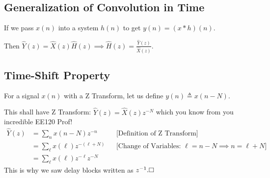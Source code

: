 \subsection{ Generalization of Convolution in Time}
If we pass $x(n)$ into a system $h(n)$ to get $y(n)=(x\ast h)(n)$.

Then $\hat Y(z) = \hat X(z)\hat H(z)\implies \hat H(z)=\frac{\hat Y(z)}{\hat X(z)}$.

\subsection{ Time-Shift Property}
For a signal $x(n)$ with a Z Transform, let us define $y(n)\triangleq x(n-N)$.

This shall have Z Transform: $\hat Y(z)=\hat X(z)z^{-N}$ which you know from you incredible EE120 Prof!
\begin{align*}
    \hat Y(z)
    &= \sum_{n} x(n-N) z^{-n}
    &&\text{[Definition of Z Transform]}
    \\
    &= \sum_{\ell} x(\ell) z^{-(\ell+N)}
    &&\text{[Change of Variables: $\ell=n-N\implies n=\ell+N$]}
    \\
    &= \sum_{\ell} x(\ell) z^{-\ell} z^{-N }
\end{align*}
This is why we saw delay blocks written as $z^{-1}.\hfill\square$
